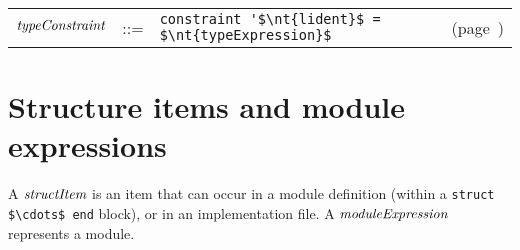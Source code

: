 \begin{center}
\begin{tabular}{rcll}
$\textit{\rmfamily typeConstraint}$ & ::= & \hbox{\lstinline/constraint '$\nt{lident}$ = $\nt{typeExpression}$/} & (page~\pageref{keyword:constraint})
\end{tabular}
\end{center}

\newpage
\section{Structure items and module expressions}

A $\textit{\rmfamily structItem}$ is an item that can occur in a module definition (within a 
\hbox{\lstinline/struct $\cdots$ end/} block), or in an implementation file.  A $\textit{\rmfamily moduleExpression}$
represents a module.

